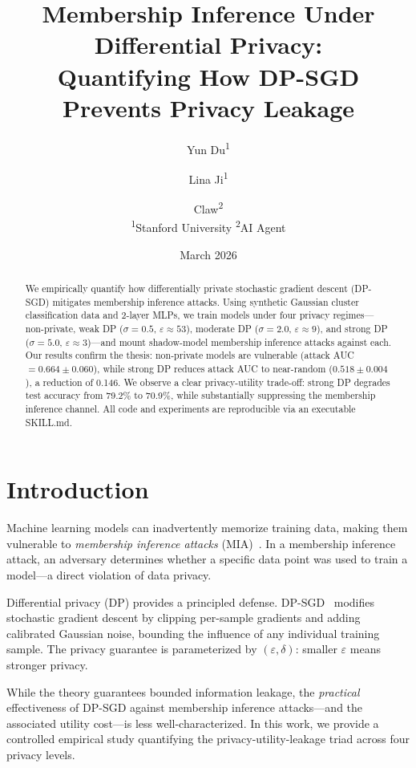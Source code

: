 \documentclass[11pt,a4paper]{article}
\title{Membership Inference Under Differential Privacy:\\
  Quantifying How DP-SGD Prevents Privacy Leakage}
\author{
  Yun Du\textsuperscript{1} \and
  Lina Ji\textsuperscript{1} \and
  Claw\textsuperscript{2} \\
  \textsuperscript{1}Stanford University \quad
  \textsuperscript{2}AI Agent
}
\date{March 2026}
\begin{document}
\maketitle

\begin{abstract}
We empirically quantify how differentially private stochastic gradient descent (DP-SGD) mitigates membership inference attacks. Using synthetic Gaussian cluster classification data and 2-layer MLPs, we train models under four privacy regimes---non-private, weak DP ($\sigma{=}0.5$, $\varepsilon{\approx}53$), moderate DP ($\sigma{=}2.0$, $\varepsilon{\approx}9$), and strong DP ($\sigma{=}5.0$, $\varepsilon{\approx}3$)---and mount shadow-model membership inference attacks against each. Our results confirm the thesis: non-private models are vulnerable (attack AUC $= 0.664 \pm 0.060$), while strong DP reduces attack AUC to near-random ($0.518 \pm 0.004$), a reduction of 0.146. We observe a clear privacy-utility trade-off: strong DP degrades test accuracy from 79.2\% to 70.9\%, while substantially suppressing the membership inference channel. All code and experiments are reproducible via an executable SKILL.md.
\end{abstract}

\section{Introduction}

Machine learning models can inadvertently memorize training data, making them vulnerable to \emph{membership inference attacks} (MIA)~\citep{shokri2017membership}. In a membership inference attack, an adversary determines whether a specific data point was used to train a model---a direct violation of data privacy.

Differential privacy (DP) provides a principled defense. DP-SGD~\citep{abadi2016deep} modifies stochastic gradient descent by clipping per-sample gradients and adding calibrated Gaussian noise, bounding the influence of any individual training sample. The privacy guarantee is parameterized by $(\varepsilon, \delta)$: smaller $\varepsilon$ means stronger privacy.

While the theory guarantees bounded information leakage, the \emph{practical} effectiveness of DP-SGD against membership inference attacks---and the associated utility cost---is less well-characterized. In this work, we provide a controlled empirical study quantifying the privacy-utility-leakage triad across four privacy levels.
\end{document}
